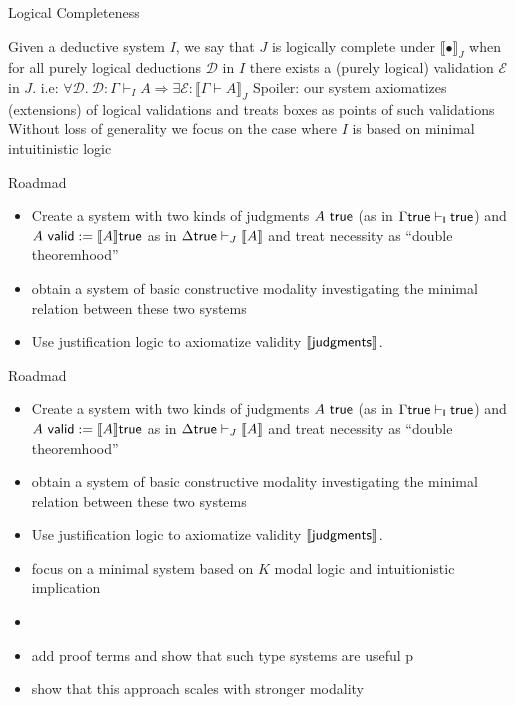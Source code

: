 \documentclass{beamer}
\begin{document}
\begin{frame}{Logical Completeness}
  \begin{outline}
  
  \1 Given a deductive system $I$, we say that $J$ is logically complete under $\llbracket\bullet \rrbracket_J$ when for all purely logical deductions $\mathcal{D}$ in $I$ there exists a (purely logical) validation $\mathcal{E}$ in $J$. i.e: 
  $\forall \mathcal{D}. \ \mathcal{D}:\Gamma\vdash_I A \Longrightarrow \exists\mathcal{E}: \llbracket \Gamma\vdash A\rrbracket_J$
 \1 Spoiler: our system axiomatizes (extensions) of logical validations and treats 
 boxes as points of such validations  
 \1 Without loss of generality we focus on the case where $I$ is
 based on minimal intuitinistic logic
\end{outline}
\end{frame}
\begin{frame}{Roadmad}
  \begin{itemize}
 \item Create a system with two kinds of judgments 
 $A \ {\sf true}$ (as in $\Gamma\sf{true}\vdash_I \sf {true}$) and 
 $A\ {\sf valid}:=\llbracket A \rrbracket  
 {\sf true}$ as in $\Delta {\sf true}\vdash_J\llbracket A \rrbracket$ 
 and treat necessity as “double theoremhood”
\item obtain a system of basic constructive modality investigating the minimal relation between these two systems
\item Use justification logic to axiomatize validity $\llbracket \sf {judgments}\rrbracket$.
\end{itemize}
\end{frame}
\begin{frame}{Roadmad}
  \begin{itemize}
 \item Create a system with two kinds of judgments 
 $A \ {\sf true}$ (as in $\Gamma\sf{true}\vdash_I \sf {true}$) and 
 $A\ {\sf valid}:=\llbracket A \rrbracket  
 {\sf true}$ as in $\Delta {\sf true}\vdash_J\llbracket A \rrbracket$ 
 and treat necessity as “double theoremhood”
\item obtain a system of basic constructive modality investigating the minimal relation between these two systems
\item Use justification logic to axiomatize validity $\llbracket \sf {judgments}\rrbracket$.
\item focus on a minimal system based on $K$ modal logic and intuitionistic implication
\item \item add proof terms and show that such type systems are useful p

\item show that this approach scales with stronger modality
\end{itemize}
\end{frame}
\end{document}
